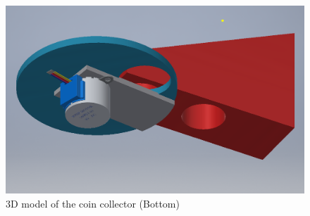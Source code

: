 \documentclass[HardwareDesign/HardwareDesign_main.tex]{subfiles}
\begin{document}
\begin{figure}
    \centering
    \includegraphics[width=\textwidth]{HardwareDesign/Bolddispenser/graphics/coinmaster-under.png}
    \caption{3D model of the coin collector (Bottom)}
    \label{fig:3D-CoinBottom}
\end{figure}
\end{document}
